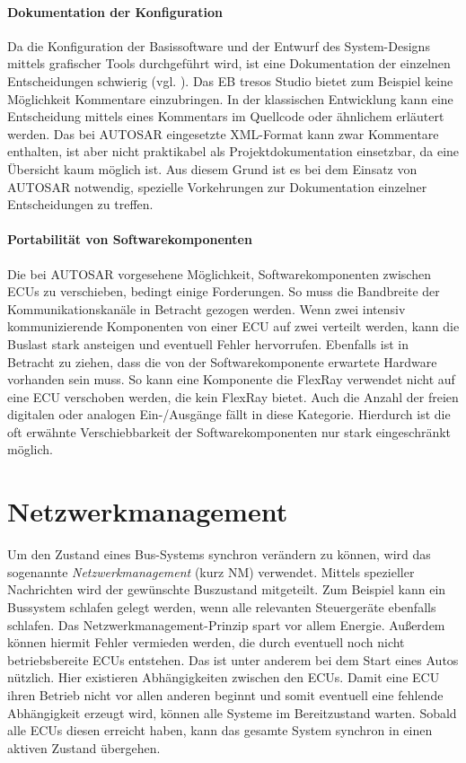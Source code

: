 \documentclass[
  a4paper,					    %
  twoside,
  DIV=calc,     				%
  bibliography=totoc,
  cleardoublepage=empty,
  ngerman,     					%
  final       					%
]{scrbook}
\begin{document}
\paragraph{Dokumentation der Konfiguration}
Da die Konfiguration der Basissoftware und der Entwurf des System-Designs mittels grafischer Tools durchgeführt wird, ist eine Dokumentation der einzelnen Entscheidungen schwierig (vgl. \cite[Seite 182 f.]{SE_Autosar}). Das EB tresos Studio bietet zum Beispiel keine Möglichkeit Kommentare einzubringen. In der klassischen Entwicklung kann eine Entscheidung mittels eines Kommentars im Quellcode oder ähnlichem erläutert werden. Das bei AUTOSAR eingesetzte XML-Format kann zwar Kommentare enthalten, ist aber nicht praktikabel als Projektdokumentation einsetzbar, da eine Übersicht kaum möglich ist. Aus diesem Grund ist es bei dem Einsatz von AUTOSAR notwendig, spezielle Vorkehrungen zur Dokumentation einzelner Entscheidungen zu treffen.

\paragraph{Portabilität von Softwarekomponenten}
Die bei AUTOSAR vorgesehene Möglichkeit, Softwarekomponenten zwischen ECUs zu verschieben, bedingt einige Forderungen. So muss die Bandbreite der Kommunikationskanäle in Betracht gezogen werden. Wenn zwei intensiv kommunizierende Komponenten von einer ECU auf zwei verteilt werden, kann die Buslast stark ansteigen und eventuell Fehler hervorrufen. Ebenfalls ist in Betracht zu ziehen, dass die von der Softwarekomponente erwartete Hardware vorhanden sein muss. So kann eine Komponente die FlexRay verwendet nicht auf eine ECU verschoben werden, die kein FlexRay bietet. Auch die Anzahl der freien digitalen oder analogen Ein-/Ausgänge fällt in diese Kategorie. Hierdurch ist die oft erwähnte Verschiebbarkeit der Softwarekomponenten nur stark eingeschränkt möglich.






\section{Netzwerkmanagement}
\label{sec:Netzwerkmanagement}
Um den Zustand eines Bus-Systems synchron verändern zu können, wird das sogenannte \emph{Netzwerkmanagement} (kurz NM) verwendet. Mittels spezieller Nachrichten wird der gewünschte Buszustand mitgeteilt. Zum Beispiel kann ein Bussystem schlafen gelegt werden, wenn alle relevanten Steuergeräte ebenfalls schlafen. Das Netzwerkmanagement-Prinzip spart vor allem Energie. Außerdem können hiermit Fehler vermieden werden, die durch eventuell noch nicht betriebsbereite ECUs entstehen. Das ist unter anderem bei dem Start eines Autos nützlich. Hier existieren Abhängigkeiten zwischen den ECUs. Damit eine ECU ihren Betrieb nicht vor allen anderen beginnt und somit eventuell eine fehlende Abhängigkeit erzeugt wird, können alle Systeme im Bereitzustand warten. Sobald alle ECUs diesen erreicht haben, kann das gesamte System synchron in einen aktiven Zustand übergehen.
\end{document}
